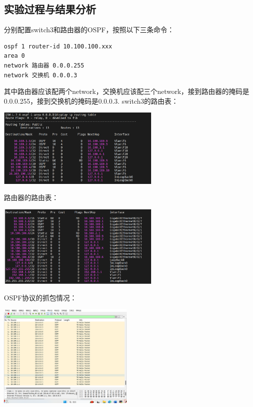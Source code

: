 \documentclass{article}
\begin{document}
\subsection{实验过程与结果分析}
分别配置switch3和路由器的OSPF，按照以下三条命令：
\begin{lstlisting}[language=bash]
ospf 1 router-id 10.100.100.xxx
area 0
network 路由器 0.0.0.255
network 交换机 0.0.0.3
\end{lstlisting}
其中路由器应该配两个network，交换机应该配三个network，接到路由器的掩码是0.0.0.255，接到交换机的掩码是0.0.0.3.
switch3的路由表：

\vspace{10pt}
\centerline{\includegraphics[width=0.6\textwidth]{4_1_images/6.png}}
\vspace{10pt}

路由器的路由表：

\vspace{10pt}
\centerline{\includegraphics[width=0.6\textwidth]{4_1_images/7.png}}
\vspace{10pt}

OSPF协议的抓包情况：

\vspace{10pt}
\centerline{\includegraphics[width=0.5\textwidth]{4_1_images/8.png}}
\vspace{10pt}
\end{document}
